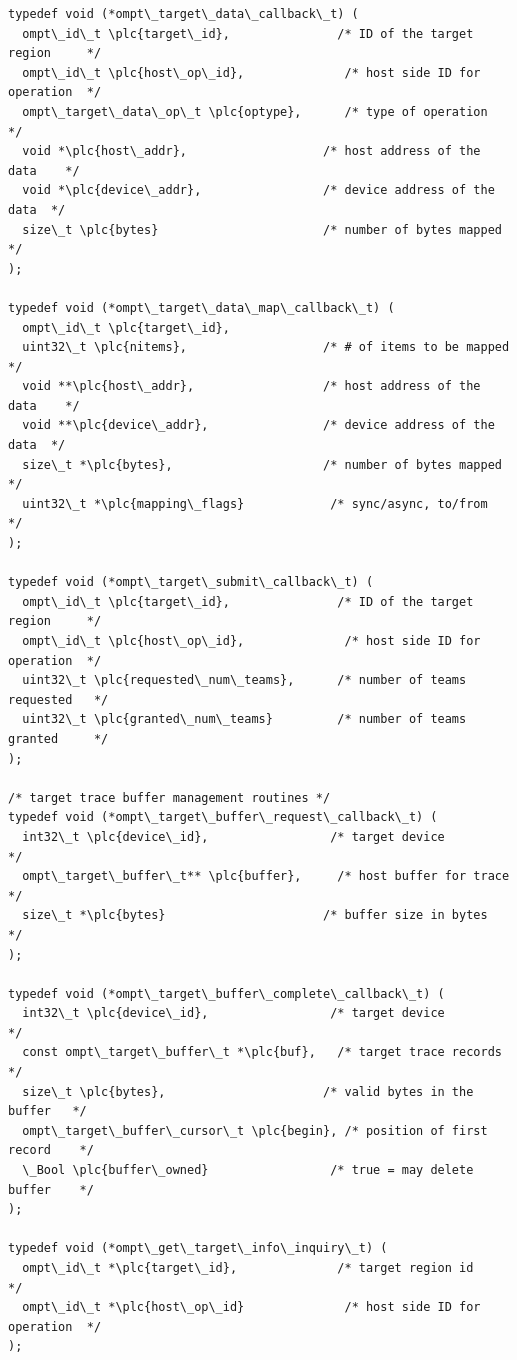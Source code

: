 \documentclass{article}
\begin{document}
\begin{boxedcode}
\begin{verbatim}
typedef void (*ompt\_target\_data\_callback\_t) (
  ompt\_id\_t \plc{target\_id},               /* ID of the target region     */
  ompt\_id\_t \plc{host\_op\_id},              /* host side ID for operation  */
  ompt\_target\_data\_op\_t \plc{optype},      /* type of operation           */
  void *\plc{host\_addr},                   /* host address of the data    */
  void *\plc{device\_addr},                 /* device address of the data  */ 
  size\_t \plc{bytes}                       /* number of bytes mapped      */
);

typedef void (*ompt\_target\_data\_map\_callback\_t) (
  ompt\_id\_t \plc{target\_id}, 
  uint32\_t \plc{nitems},                   /* # of items to be mapped     */
  void **\plc{host\_addr},                  /* host address of the data    */
  void **\plc{device\_addr},                /* device address of the data  */ 
  size\_t *\plc{bytes},                     /* number of bytes mapped      */
  uint32\_t *\plc{mapping\_flags}            /* sync/async, to/from         */
);

typedef void (*ompt\_target\_submit\_callback\_t) (
  ompt\_id\_t \plc{target\_id},               /* ID of the target region     */
  ompt\_id\_t \plc{host\_op\_id},              /* host side ID for operation  */
  uint32\_t \plc{requested\_num\_teams},      /* number of teams requested   */
  uint32\_t \plc{granted\_num\_teams}         /* number of teams granted     */
);

/* target trace buffer management routines */
typedef void (*ompt\_target\_buffer\_request\_callback\_t) (
  int32\_t \plc{device\_id},                 /* target device               */
  ompt\_target\_buffer\_t** \plc{buffer},     /* host buffer for trace       */
  size\_t *\plc{bytes}                      /* buffer size in bytes        */
);
  
typedef void (*ompt\_target\_buffer\_complete\_callback\_t) (
  int32\_t \plc{device\_id},                 /* target device               */
  const ompt\_target\_buffer\_t *\plc{buf},   /* target trace records        */
  size\_t \plc{bytes},                      /* valid bytes in the buffer   */
  ompt\_target\_buffer\_cursor\_t \plc{begin}, /* position of first record    */
  \_Bool \plc{buffer\_owned}                 /* true = may delete buffer    */
);

typedef void (*ompt\_get\_target\_info\_inquiry\_t) (
  ompt\_id\_t *\plc{target\_id},              /* target region id            */
  ompt\_id\_t *\plc{host\_op\_id}              /* host side ID for operation  */
);


\end{verbatim}
\end{boxedcode}
\end{document}
